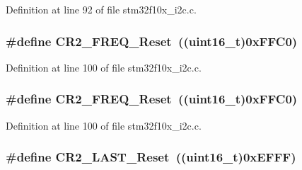 Definition at line 92 of file stm32f10x\+\_\+i2c.\+c.

\subsubsection[{\texorpdfstring{C\+R2\+\_\+\+F\+R\+E\+Q\+\_\+\+Reset}{CR2_FREQ_Reset}}]{\setlength{\rightskip}{0pt plus 5cm}\#define C\+R2\+\_\+\+F\+R\+E\+Q\+\_\+\+Reset~(({\bf uint16\+\_\+t})0x\+F\+F\+C0)}\hypertarget{group___i2_c___private___defines_ga2bcf74bd8fc3aaa931faf750d1afe405}{}\label{group___i2_c___private___defines_ga2bcf74bd8fc3aaa931faf750d1afe405}


Definition at line 100 of file stm32f10x\+\_\+i2c.\+c.

\subsubsection[{\texorpdfstring{C\+R2\+\_\+\+F\+R\+E\+Q\+\_\+\+Reset}{CR2_FREQ_Reset}}]{\setlength{\rightskip}{0pt plus 5cm}\#define C\+R2\+\_\+\+F\+R\+E\+Q\+\_\+\+Reset~(({\bf uint16\+\_\+t})0x\+F\+F\+C0)}\hypertarget{group___i2_c___private___defines_ga2bcf74bd8fc3aaa931faf750d1afe405}{}\label{group___i2_c___private___defines_ga2bcf74bd8fc3aaa931faf750d1afe405}


Definition at line 100 of file stm32f10x\+\_\+i2c.\+c.

\subsubsection[{\texorpdfstring{C\+R2\+\_\+\+L\+A\+S\+T\+\_\+\+Reset}{CR2_LAST_Reset}}]{\setlength{\rightskip}{0pt plus 5cm}\#define C\+R2\+\_\+\+L\+A\+S\+T\+\_\+\+Reset~(({\bf uint16\+\_\+t})0x\+E\+F\+F\+F)}\hypertarget{group___i2_c___private___defines_ga904e044226182269485936bad8314f84}{}\label{group___i2_c___private___defines_ga904e044226182269485936bad8314f84}


